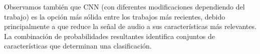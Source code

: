 \documentclass[11pt,a4paper,spanish]{book}
\begin{document}
	Observamos también que CNN (con diferentes modificaciones dependiendo del trabajo) es la opción más sólida entre los trabajos más recientes, debido principalmente a que reduce la señal de audio a sus características más relevantes. La combinación de probabilidades resultantes identifica conjuntos de características que determinan una clasificación.
	

	
	
	
		
	
	\printbibliography
\end{document}
